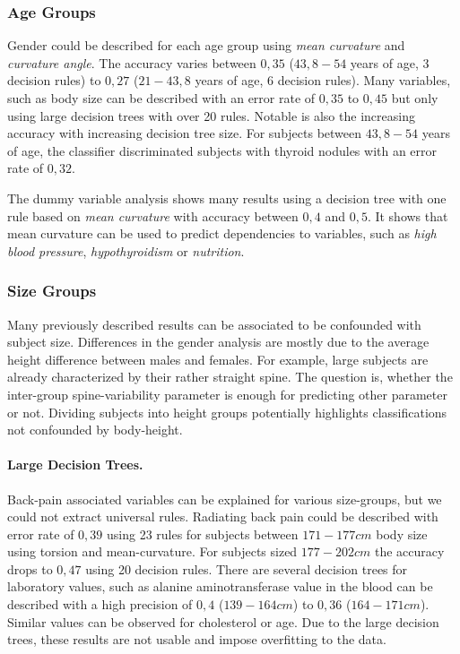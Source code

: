 \documentclass[a4paper,twoside]{style/article}
\newcommand{\com}[1]{\textcolor{orange}{\uline{#1}}}
\begin{document}
\subsubsection{Age Groups}
Gender could be described for each age group using \emph{mean curvature} and \emph{curvature angle}.
The accuracy varies between $0,35$ ($43,8-54$ years of age, 3 decision rules) to $0,27$ ($21-43,8$ years of age, 6 decision rules).
Many variables, such as body size can be described with an error rate of $0,35$ to $0,45$ but only using large decision trees with over 20 rules.
Notable is also the increasing accuracy with increasing decision tree size.
For subjects between $43,8-54$ years of age, the classifier discriminated subjects with thyroid nodules with an error rate of $0,32$.

The dummy variable analysis shows many results using a decision tree with one rule based on \emph{mean curvature} with accuracy between $0,4$ and $0,5$.
It shows that mean curvature can be used to predict dependencies to variables, such as \emph{high blood pressure}, \emph{hypothyroidism} or \emph{nutrition}.

\subsubsection{Size Groups}
Many previously described results can be associated to be confounded with subject size.
Differences in the gender analysis are mostly due to the average height difference between males and females.
For example, large subjects are already characterized by their rather straight spine.
%
The question is, whether the inter-group spine-variability parameter is enough for predicting other parameter or not.
Dividing subjects into height groups potentially highlights classifications not confounded by body-height.
\paragraph{Large Decision Trees. }
Back-pain associated variables can be explained for various size-groups, but we could not extract universal rules.
Radiating back pain could be described with error rate of $0,39$ using 23 rules for subjects between $171-177 cm$ body size using torsion and mean-curvature.
For subjects sized $177-202 cm$ the accuracy drops to $0,47$ using 20  decision rules.
There are several decision trees for laboratory values, such as alanine aminotransferase value in the blood can be described with a high precision of $0,4$ ($139-164 cm$) to $0,36$ ($164 - 171 cm$).
Similar values can be observed for cholesterol or age.
Due to the large decision trees, these results are not usable and impose overfitting to the data.
\end{document}
